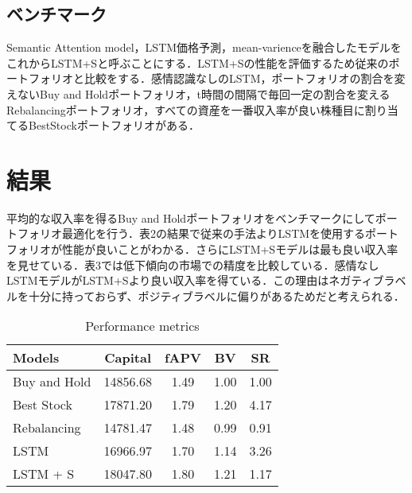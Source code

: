 \documentclass[submit,techrep,noauthor]{ipsj}
\begin{document}
\subsection{ベンチマーク}
Semantic Attention model，LSTM価格予測，mean-varienceを融合したモデルをこれからLSTM+Sと呼ぶことにする．LSTM+Sの性能を評価するため従来のポートフォリオと比較をする．感情認識なしのLSTM，ポートフォリオの割合を変えないBuy and Holdポートフォリオ，t時間の間隔で毎回一定の割合を変えるRebalancingポートフォリオ，すべての資産を一番収入率が良い株種目に割り当てるBestStockポートフォリオがある．


\section{結果}
平均的な収入率を得るBuy and Holdポートフォリオをベンチマークにしてポートフォリオ最適化を行う．表2の結果で従来の手法よりLSTMを使用するポートフォリオが性能が良いことがわかる．さらにLSTM+Sモデルは最も良い収入率を見せている．表3では低下傾向の市場での精度を比較している．感情なしLSTMモデルがLSTM+Sより良い収入率を得ている．この理由はネガティブラベルを十分に持っておらず、ポジティブラベルに偏りがあるためだと考えられる．



\begin{table}[htb] %
\caption{Performance metrics} %
\label{release} %
\begin{center}
\begin{tabular}{| l | c | c  | c | c |} \hline %
Models & Capital & fAPV &BV & SR  \\ \hline %
Buy and Hold & 14856.68 & 1.49 & 1.00 &  1.00 \\ 
Best Stock &17871.20 &1.79& 1.20 &  4.17 \\
Rebalancing  &14781.47 &  1.48 & 0.99 &  0.91\\
LSTM  & 16966.97 &1.70 & 1.14 &  3.26\\
LSTM + S  &18047.80 &1.80 & 1.21 &  1.17\\ \hline
\end{tabular}
\end{center}
\end{table}
\end{document}
